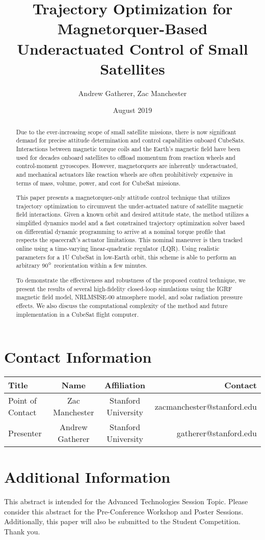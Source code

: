 \documentclass{article}
\begin{document}
\title{Trajectory Optimization for Magnetorquer-Based Underactuated Control of Small Satellites}
\author{Andrew Gatherer, Zac Manchester}
\date{August 2019}
\maketitle

\begin{abstract}
Due to the ever-increasing scope of small satellite missions, there is now significant demand for precise attitude determination and control capabilities onboard CubeSats. Interactions between magnetic torque coils and the Earth's magnetic field have been used for decades onboard satellites to offload momentum from reaction wheels and control-moment gyroscopes. However, magnetorquers are inherently underactuated, and mechanical actuators like reaction wheels are often prohibitively expensive in terms of mass, volume, power, and cost for CubeSat missions.

This paper presents a magnetorquer-only attitude control technique that utilizes trajectory optimization to circumvent the under-actuated nature of satellite magnetic field interactions. Given a known orbit and desired attitude state, the method utilizes a simplified dynamics model and a fast constrained trajectory optimization solver based on differential dynamic programming to arrive at a nominal torque profile that respects the spacecraft's actuator limitations. This nominal maneuver is then tracked online using a time-varying linear-quadratic regulator (LQR). Using realistic parameters for a 1U CubeSat in low-Earth orbit, this scheme is able to perform an arbitrary 90$\degree$ reorientation within a few minutes.

To demonstrate the effectiveness and robustness of the proposed control technique, we present the results of several high-fidelity closed-loop simulations using the IGRF magnetic field model, NRLMSISE-00 atmosphere model, and solar radiation pressure effects. We also discuss the computational complexity of the method and future implementation in a CubeSat flight computer.

\end{abstract}

\section{Contact Information}
\begin{tabular}{l | c | c | r}
	\hline
	Title & Name & Affiliation & Contact\\
	\hline
	Point of Contact & Zac Manchester & Stanford University & zacmanchester@stanford.edu\\
	Presenter & Andrew Gatherer & Stanford University & gatherer@stanford.edu\\
\end{tabular}
	
\section{Additional Information}
This abstract is intended for the Advanced Technologies Session Topic. Please consider this abstract for the Pre-Conference Workshop and Poster Sessions. Additionally, this paper will also be submitted to the Student Competition. Thank you. 
\end{document}
